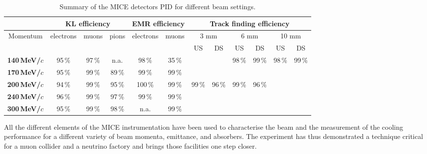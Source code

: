 \begin{table}[htb!]
\begin{tabular}{c|ccc|cc|cc|cc|cc}
 &
  \multicolumn{3}{c|}{\textbf{KL efficiency}} &
  \multicolumn{2}{c|}{\textbf{EMR efficiency}} &
  \multicolumn{6}{c}{\textbf{Track finding efficiency}} \\ 
  \hline
  \multirow{2}{*}{Momentum} &
  \multirow{2}{*}{electrons} &
  \multirow{2}{*}{muons} &
  \multirow{2}{*}{pions} &
  \multirow{2}{*}{electrons} &
  \multirow{2}{*}{muons} &
  \multicolumn{2}{c|}{3 mm} &
  \multicolumn{2}{c|}{6 mm} &
  \multicolumn{2}{c}{10 mm} \\  
             &      &      &      &       &      & US   & DS   & US   & DS   & US   & DS   \\ \hline
\textbf{140\,MeV/$c$} & 95\,\% & 97\,\% & n.a.   & 98\,\%  & 35\,\% &        &      & 98\,\%   & 99\,\% & 98\,\% & 99\,\% \\ \hline
\textbf{170\,MeV/$c$} & 95\,\% & 99\,\% & 89\,\% & 99\,\%  & 99\,\% &        &      &          &        &        &      \\ \hline
\textbf{200\,MeV/$c$} & 94\,\% & 99\,\% & 95\,\% & 100\,\% & 99\,\% & 99\,\% & 96\,\% & 99\,\% & 96\,\% &        &      \\ \hline
\textbf{240\,MeV/$c$} & 96\,\% & 99\,\% & 97\,\% & 99\,\%  & 99\,\% &        &      &          &        &        &      \\ \hline
\textbf{300\,MeV/$c$} & 95\,\% & 99\,\% & 98\,\% & n.a.    & 99\,\% &        &      &          &        &        &     
\end{tabular}
	\caption{Summary of the MICE detectors PID for different beam settings.}
	\label{tab:pid2}
\end{table}
All the different elements of the MICE instrumentation have been used to characterise the beam and the measurement of the cooling performance for a different variety of beam momenta, emittance, and absorbers.
The experiment has thus demonstrated a technique critical for a muon collider and a neutrino factory and brings those facilities one step closer.
